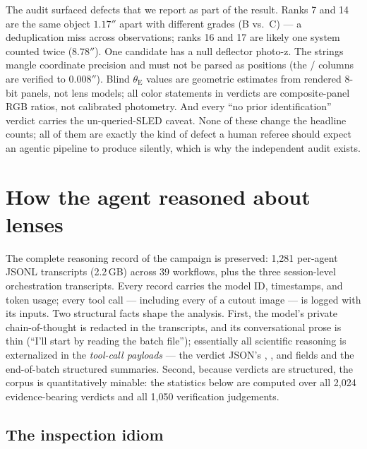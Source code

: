 \documentclass[11pt,letterpaper]{article}
\newcommand{\thetaE}{\ensuremath{\theta_{\mathrm{E}}}}
\newcommand{\numflagged}{2{,}024}
\begin{document}
The audit surfaced defects that we report as part of the result. Ranks 7 and
14 are the same object $1.17''$ apart with different grades (B vs.\ C) ---
a deduplication miss across observations; ranks 16 and 17 are likely one
system counted twice ($8.78''$). One candidate has a null deflector photo-z.
The  strings mangle coordinate precision and must not be
parsed as positions (the / columns are verified
to $0.008''$). Blind \thetaE{} values are geometric estimates from rendered
$8$-bit panels, not lens models; all color statements in verdicts are
composite-panel RGB ratios, not calibrated photometry. And every ``no prior
identification'' verdict carries the un-queried-SLED caveat. None of these
change the headline counts; all of them are exactly the kind of defect a
human referee should expect an agentic pipeline to produce silently, which is
why the independent audit exists.

\section{How the agent reasoned about lenses}\label{sec:reasoning}

The complete reasoning record of the campaign is preserved: 1{,}281 per-agent
JSONL transcripts (2.2\,GB) across 39 workflows, plus the three session-level
orchestration transcripts. Every record carries the model ID, timestamps, and
token usage; every tool call --- including every  of a cutout image
--- is logged with its inputs. Two structural facts shape the analysis. First,
the model's private chain-of-thought is redacted in the transcripts, and its
conversational prose is thin (``I'll start by reading the batch file'');
essentially all scientific reasoning is externalized in the \emph{tool-call
payloads} --- the verdict JSON's , , and
 fields and the end-of-batch structured summaries. Second,
because verdicts are structured, the corpus is quantitatively minable: the
statistics below are computed over all \numflagged{} evidence-bearing verdicts
and all 1{,}050 verification judgements.

\subsection{The inspection idiom}\label{sec:idiom}
\end{document}
